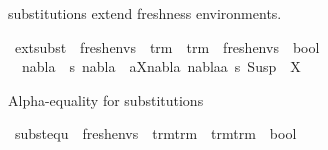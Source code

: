 \begin{isabellebody}
\begin{isamarkuptext}
substitutions extend freshness environments.%
\end{isamarkuptext}\isamarkuptrue%
\isamarkupfalse%
\ ext{\isacharunderscore}{\kern0pt}subst\ {\isacharcolon}{\kern0pt}{\isacharcolon}{\kern0pt}\ {\isachardoublequoteopen}fresh{\isacharunderscore}{\kern0pt}envs\ {\isasymRightarrow}\ {\isacharparenleft}{\kern0pt}trm\ {\isasymRightarrow}\ trm{\isacharparenright}{\kern0pt}\ {\isasymRightarrow}\ fresh{\isacharunderscore}{\kern0pt}envs\ {\isasymRightarrow}\ bool{\isachardoublequoteclose}\ {\isacharparenleft}{\kern0pt}{\isachardoublequoteopen}\ {\isacharunderscore}{\kern0pt}\ {\isasymTurnstile}\ {\isacharunderscore}{\kern0pt}\ {\isacharunderscore}{\kern0pt}\ {\isachardoublequoteclose}\ {\isacharbrackleft}{\kern0pt}{}{}{\isacharcomma}{\kern0pt}{}{}{\isacharcomma}{\kern0pt}{}{}{\isacharbrackright}{\kern0pt}\ {}{}{\isacharparenright}{\kern0pt}\ \isanewline
\ \ {\isachardoublequoteopen}nabla{}\ {\isasymTurnstile}\ s\ nabla{}\ {\isasymequiv}\ {\isacharparenleft}{\kern0pt}{\isasymforall}{\isacharparenleft}{\kern0pt}a{\isacharcomma}{\kern0pt}X{\isacharparenright}{\kern0pt}{\isasymin}nabla{}{\isachardot}{\kern0pt}\ nabla{}{\isasymturnstile}a{\isasymsharp}\ s\ {\isacharparenleft}{\kern0pt}Susp\ {\isacharbrackleft}{\kern0pt}{\isacharbrackright}{\kern0pt}\ X{\isacharparenright}{\kern0pt}{\isacharparenright}{\kern0pt}{\isachardoublequoteclose}%
\begin{isamarkuptext}%
Alpha-equality for substitutions%
\end{isamarkuptext}\isamarkuptrue%
\isamarkupfalse%
\ subst{\isacharunderscore}{\kern0pt}equ\ {\isacharcolon}{\kern0pt}{\isacharcolon}{\kern0pt}\ {\isachardoublequoteopen}fresh{\isacharunderscore}{\kern0pt}envs\ {\isasymRightarrow}\ {\isacharparenleft}{\kern0pt}trm{\isasymRightarrow}trm{\isacharparenright}{\kern0pt}\ {\isasymRightarrow}\ {\isacharparenleft}{\kern0pt}trm{\isasymRightarrow}trm{\isacharparenright}{\kern0pt}\ {\isasymRightarrow}\ bool{\isachardoublequoteclose}\ {\isacharparenleft}{\kern0pt}{\isachardoublequoteopen}\ {\isacharunderscore}{\kern0pt}\ {\isasymTurnstile}\ {\isacharunderscore}{\kern0pt}\ {\isasymapprox}\ {\isacharunderscore}{\kern0pt}{\isachardoublequoteclose}\ {\isacharbrackleft}{\kern0pt}{}{}{\isacharcomma}{\kern0pt}{}{}{\isacharcomma}{\kern0pt}{}{}{\isacharbrackright}{\kern0pt}\ {}{}{\isacharparenright}{\kern0pt}\isanewline

\end{isabellebody}
